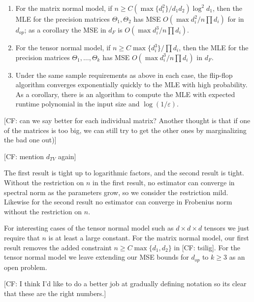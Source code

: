 \documentclass{article}
\newcommand\eps{\varepsilon}
\newcommand{\CF}[1]{{\color{purple}[CF: #1]}}
\begin{document}
\begin{enumerate}
\item For the matrix normal model, if $n \geq C (\max\{d_i^2\}/d_1 d_2) \log^2 d_1$, then the MLE for the precision matrices $\Theta_1, \Theta_2$ has MSE $O( \max d_i^2/ n \prod d_i )$ for in $d_{op}$; as a corollary the MSE in $d_F$ is $O( \max d_i^3/ n \prod d_i )$.
\item For the tensor normal model, if $n \geq C \max\{d_i^3\}/ \prod d_i$, then the MLE for the precision matrices $\Theta_1, \dots, \Theta_k$ has MSE $O(\max d_i^3/ n \prod d_i)$ in $d_F$.
\item Under the same sample requirements as above in each case, the flip-flop algorithm converges exponentially quickly to the MLE with high probability. As a corollary, there is an algorithm to compute the MLE with expected runtime polynomial in the input size and $\log(1/\eps)$. 
\end{enumerate}
\CF{can we say better for each individual matrix? Another thought is that if one of the matrices is too big, we can still try to get the other ones by marginalizing the bad one out)}

\CF{mention $d_{TV}$ again}

The first result is tight up to logarithmic factors, and the second result is tight. Without the restriction on $n$ in the first result, no estimator can converge in spectral norm as the parameters grow, so we consider the restriction mild. Likewise for the second result no estimator can converge in Frobenius norm without the restriction on $n$. 


For interesting cases of the tensor normal model such as $d\times d \times d$ tensors we just require that $n$ is at least a large constant. For the matrix normal model, our first result removes the added constraint $n \geq C \max\{d_1,d_2\}$ in \CF{tsilig}. For the tensor normal model we leave extending our MSE bounds for $d_{op}$ to $k \geq 3$ as an open problem. 

\CF{I think I'd like to do a better job at gradually defining notation so its clear that these are the right numbers.}
\end{document}
